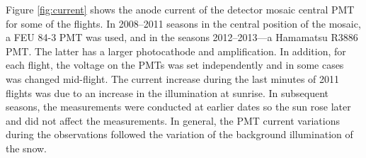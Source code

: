 \documentclass[universe,article,accept,moreauthors,pdftex]{Definitions/mdpi}
\begin{document}




 Figure \ref{fig:current} shows the anode current of the detector mosaic central PMT for some of the flights. In 2008--2011 seasons in the central position of the mosaic, a FEU 84-3 PMT was used, and in the seasons 2012--2013---a Hamamatsu R3886 PMT. The latter has a larger photocathode and amplification. In addition, for each flight, the voltage on the PMTs was set independently and in some cases was changed mid-flight. The current increase during the last minutes of 2011 flights was due to an increase in the illumination at sunrise. In subsequent seasons, the measurements were conducted at earlier dates so the sun rose later and did not affect the measurements. In general, the PMT current variations during the observations followed the variation of the background illumination of the snow.
\end{document}
